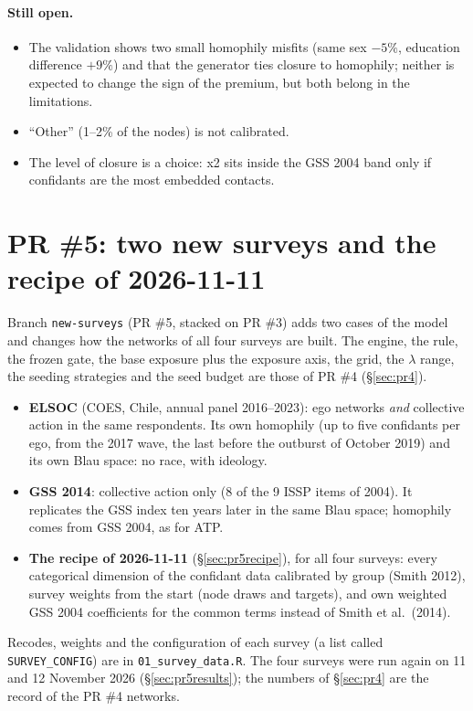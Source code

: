 \documentclass[11pt,a4paper]{article}
\newcommand{\code}[1]{\texttt{#1}}
\begin{document}
\paragraph{Still open.}
\begin{itemize}
  \item The validation shows two small homophily misfits (same sex $-5\%$, education
    difference $+9\%$) and that the generator ties closure to homophily; neither is
    expected to change the sign of the premium, but both belong in the limitations.
  \item ``Other'' (1--2\% of the nodes) is not calibrated.
  \item The level of closure is a choice: x2 sits inside the GSS 2004 band only if
    confidants are the most embedded contacts.
\end{itemize}

\section{PR \#5: two new surveys and the recipe of 2026-11-11}
\label{sec:pr5}

Branch \code{new-surveys} (PR \#5, stacked on PR \#3) adds two cases of the model and changes how the
networks of all four surveys are built. The engine, the rule, the frozen gate, the base exposure plus
the exposure axis, the grid, the $\lambda$ range, the seeding strategies and the seed budget are those
of PR \#4 (\S\ref{sec:pr4}).
\begin{itemize}
  \item \textbf{ELSOC} (COES, Chile, annual panel 2016--2023): ego networks \emph{and} collective
    action in the same respondents. Its own homophily (up to five confidants per ego, from the 2017
    wave, the last before the outburst of October 2019) and its own Blau space: no race, with ideology.
  \item \textbf{GSS 2014}: collective action only (8 of the 9 ISSP items of 2004). It replicates the
    GSS index ten years later in the same Blau space; homophily comes from GSS 2004, as for ATP.
  \item \textbf{The recipe of 2026-11-11} (\S\ref{sec:pr5recipe}), for all four surveys: every
    categorical dimension of the confidant data calibrated by group (Smith 2012), survey weights from
    the start (node draws and targets), and own weighted GSS 2004 coefficients for the common terms
    instead of Smith et al.\ (2014).
\end{itemize}
Recodes, weights and the configuration of each survey (a list called \code{SURVEY\_CONFIG}) are
in \code{01\_survey\_data.R}. The four surveys were run again on 11 and 12 November 2026
(\S\ref{sec:pr5results}); the numbers of \S\ref{sec:pr4} are the record of the PR \#4 networks.
\end{document}

